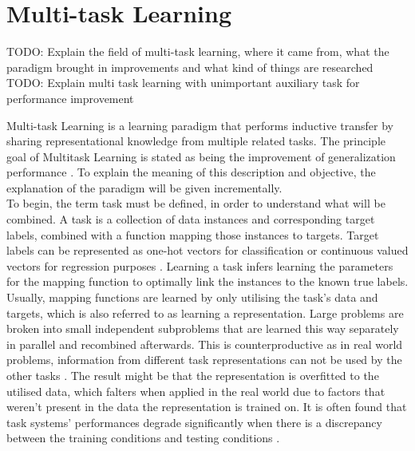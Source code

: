 
\section{Multi-task Learning}
TODO: Explain the field of multi-task learning, where it came from, what the paradigm brought in improvements and what kind of things are researched
TODO: Explain multi task learning with unimportant auxiliary task for performance improvement

Multi-task Learning is a learning paradigm that performs inductive transfer by sharing representational knowledge from multiple related tasks. The principle goal of Multitask Learning is stated as being the improvement of generalization performance \citep{caruana1997multitask}. To explain the meaning of this description and objective, the explanation of the paradigm will be given incrementally.\\

To begin, the term task must be defined, in order to understand what will be combined. A task is a collection of data instances and corresponding target labels, combined with a function mapping those instances to targets. Target labels can be represented as one-hot vectors for classification or continuous valued vectors for regression purposes \citep{meyer2019multi}. Learning a task infers learning the parameters for the mapping function to optimally link the instances to the known true labels. Usually, mapping functions are learned by only utilising the task's data and targets, which is also referred to as learning a representation. Large problems are broken into small independent subproblems that are learned this way separately in parallel and recombined afterwards. This is counterproductive as in real world problems, information from different task representations can not be used by the other tasks \citep{caruana1997multitask}. The result might be that the representation is overfitted to the utilised data, which falters when applied in the real world due to factors that weren't present in the data the representation is trained on. It is often found that task systems' performances degrade significantly when there is a discrepancy between the training conditions and testing conditions \cite{lu2004multitask}. \\

